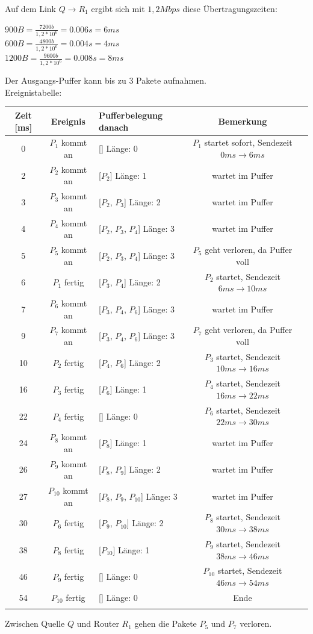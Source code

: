 \documentclass{kdiartcl}
\begin{document}
    Auf dem Link $Q \rightarrow R_1$ ergibt sich mit $1,2 Mbps$ diese Übertragungszeiten: \\
    \begin{center}
        $900 B = \frac{7200b}{1,2 * 10^6} = 0.006s = 6ms$ \\
        $600 B = \frac{4800b}{1,2 * 10^6} = 0.004s = 4ms$ \\
        $1200B = \frac{9600b}{1,2 * 10^6} = 0.008s = 8ms$
    \end{center}

    Der Ausgangs-Puffer kann bis zu 3 Pakete aufnahmen. \\
    Ereignistabelle: \\
    \begin{tabular}{c c l c c}
        \hline
        Zeit [ms] & Ereignis & Pufferbelegung danach & Bemerkung \\
        \hline
        0 & $P_1$ kommt an & [] Länge: 0 & $P_1$ startet sofort, Sendezeit $0ms \rightarrow 6ms$ \\
        2 & $P_2$ kommt an & [$P_2$] Länge: 1 & wartet im Puffer \\
        3 & $P_3$ kommt an & [$P_2$, $P_3$] Länge: 2 & wartet im Puffer \\
        4 & $P_4$ kommt an & [$P_2$, $P_3$, $P_4$] Länge: 3 & wartet im Puffer \\
        5 & $P_5$ kommt an & [$P_2$, $P_3$, $P_4$] Länge: 3 & $P_5$ geht verloren, da Puffer voll \\
        6 & $P_1$ fertig & [$P_3$, $P_4$] Länge: 2 & $P_2$ startet, Sendezeit $6ms \rightarrow 10ms$ \\
        7 & $P_6$ kommt an & [$P_3$, $P_4$, $P_6$] Länge: 3 & wartet im Puffer \\
        9 & $P_7$ kommt an & [$P_3$, $P_4$, $P_6$] Länge: 3 & $P_7$ geht verloren, da Puffer voll \\
        10 & $P_2$ fertig & [$P_4$, $P_6$] Länge: 2 & $P_3$ startet, Sendezeit $10ms \rightarrow 16ms$ \\
        16 & $P_3$ fertig & [$P_6$] Länge: 1 & $P_4$ startet, Sendezeit $16ms \rightarrow 22ms$ \\
        22 & $P_4$ fertig & [] Länge: 0 & $P_6$ startet, Sendezeit $22ms \rightarrow 30ms$ \\
        24 & $P_8$ kommt an & [$P_8$] Länge: 1 & wartet im Puffer \\
        26 & $P_9$ kommt an & [$P_8$, $P_9$] Länge: 2 & wartet im Puffer \\
        27 & $P_{10}$ kommt an & [$P_8$, $P_9$, $P_{10}$] Länge: 3 & wartet im Puffer \\
        30 & $P_6$ fertig & [$P_9$, $P_{10}$] Länge: 2 & $P_8$ startet, Sendezeit $30ms \rightarrow 38ms$ \\
        38 & $P_8$ fertig & [$P_{10}$] Länge: 1 & $P_9$ startet, Sendezeit $38ms \rightarrow 46ms$ \\
        46 & $P_9$ fertig & [] Länge: 0 & $P_{10}$ startet, Sendezeit $46ms \rightarrow 54ms$ \\
        54 & $P_{10}$ fertig & [] Länge: 0 & Ende \\
        \hline \\
    \end{tabular}
    Zwischen Quelle $Q$ und Router $R_1$ gehen die Pakete $P_5$ und $P_7$ verloren.
\end{document}
